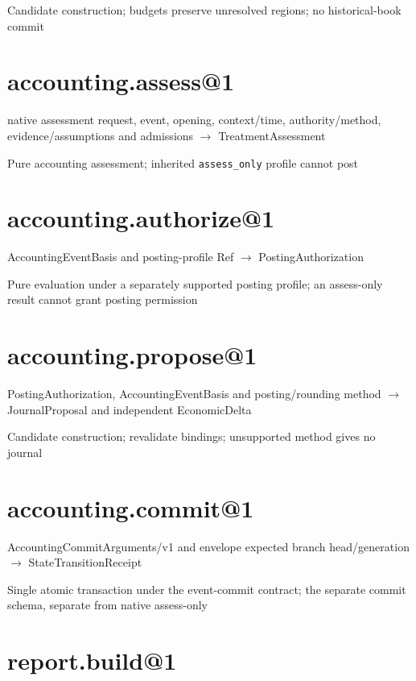 Candidate construction; budgets preserve unresolved regions; no historical-book commit

\hypertarget{accounting.assess1}{%
\section{accounting.assess@1}\label{accounting.assess1}}

native assessment request, event, opening, context/time, authority/method, evidence/assumptions and admissions \ensuremath{\rightarrow} TreatmentAssessment

Pure accounting assessment; inherited \texttt{assess\_only} profile cannot post

\hypertarget{accounting.authorize1}{%
\section{accounting.authorize@1}\label{accounting.authorize1}}

AccountingEventBasis and posting-profile Ref \ensuremath{\rightarrow} PostingAuthorization

Pure evaluation under a separately supported posting profile; an assess-only result cannot grant posting permission

\hypertarget{accounting.propose1}{%
\section{accounting.propose@1}\label{accounting.propose1}}

PostingAuthorization, AccountingEventBasis and posting/rounding method \ensuremath{\rightarrow} JournalProposal and independent EconomicDelta

Candidate construction; revalidate bindings; unsupported method gives no journal

\hypertarget{accounting.commit1}{%
\section{accounting.commit@1}\label{accounting.commit1}}

AccountingCommitArguments/v1 and envelope expected branch head/generation \ensuremath{\rightarrow} StateTransitionReceipt

Single atomic transaction under the event-commit contract; the separate commit schema, separate from native assess-only

\hypertarget{report.build1}{%
\section{report.build@1}\label{report.build1}}

